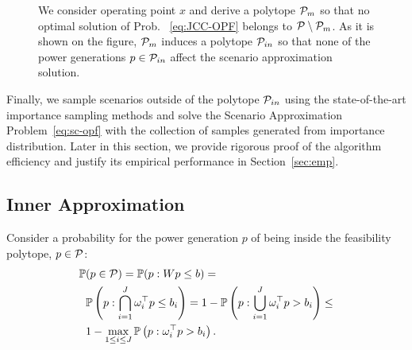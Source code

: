 \documentclass{IEEEtran4PSCC}
\newcommand{\cP}{{\cal P}}
\begin{document}
\begin{figure}
  \caption{We consider operating point $x$ and derive a polytope $\cP_{m}$ so that no optimal solution of Prob.~ \eqref{eq:JCC-OPF} belongs to $\cP\setminus \cP_{m}$. As it is shown on the figure, $\cP_{m}$ induces a polytope $\cP_{in}$ so that none of the power generations $p\in\cP_{in}$ affect the scenario approximation solution. }
  \label{fig:10}
\end{figure}



Finally, we sample scenarios outside of the polytope $\cP_{in}$ using the state-of-the-art importance sampling methods \cite{owen2019importance,lukashevich2021power} and solve the Scenario Approximation Problem~\eqref{eq:sc-opf} with the collection of samples generated from importance distribution. Later in this section, we provide rigorous proof of the algorithm efficiency and justify its empirical performance in Section~\ref{sec:emp}. 

\subsection{Inner Approximation}

Consider a probability for the power generation $p$ of being inside the feasibility polytope, $p\in \cP$:
\begin{align*}
  \mathbb{P}&(p\in \cP) = 
  \mathbb{P}(p: Wp \le b) = \\
  & \mathbb{P}\left(p: \bigcap_{i=1}^J \omega_i^\top p \le b_i\right) = 1 - \mathbb{P}\left(p: \bigcup_{i=1}^J \omega_i^\top p > b_i\right)\le\\
  & 1 - \max_{1\le i\le J}\mathbb{P}\left(p: \omega_i^\top p > b_i\right).
\end{align*}
\end{document}
